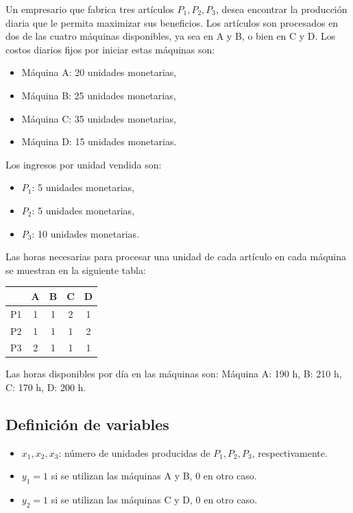 \documentclass[12pt, a4paper, oneside]{book}
\theoremstyle{definition}
\begin{document}
    Un empresario que fabrica tres artículos \(P_1, P_2, P_3\), desea encontrar la producción diaria que le permita maximizar sus beneficios. Los artículos son procesados en dos de las cuatro máquinas disponibles, ya sea en A y B, o bien en C y D. Los costos diarios fijos por iniciar estas máquinas son:

    \begin{itemize}
        \item Máquina A: 20 unidades monetarias,
        \item Máquina B: 25 unidades monetarias,
        \item Máquina C: 35 unidades monetarias,
        \item Máquina D: 15 unidades monetarias.
    \end{itemize}

    Los ingresos por unidad vendida son:

    \begin{itemize}
        \item \(P_1\): 5 unidades monetarias,
        \item \(P_2\): 5 unidades monetarias,
        \item \(P_3\): 10 unidades monetarias.
    \end{itemize}

    Las horas necesarias para procesar una unidad de cada artículo en cada máquina se muestran en la siguiente tabla:

    \begin{center}
    \begin{tabular}{|c|c|c|c|c|}
    \hline
    & A & B & C & D \\
    \hline
    P1 & 1 & 1 & 2 & 1 \\
    P2 & 1 & 1 & 1 & 2 \\
    P3 & 2 & 1 & 1 & 1 \\
    \hline
    \end{tabular}
    \end{center}

    Las horas disponibles por día en las máquinas son:  
    Máquina A: 190 h, B: 210 h, C: 170 h, D: 200 h.

    \subsection{Definición de variables}

    \begin{itemize}
        \item \(x_1, x_2, x_3\): número de unidades producidas de \(P_1, P_2, P_3\), respectivamente.
        \item \(y_1 = 1\) si se utilizan las máquinas A y B, 0 en otro caso.
        \item \(y_2 = 1\) si se utilizan las máquinas C y D, 0 en otro caso.
    \end{itemize}
\end{document}
